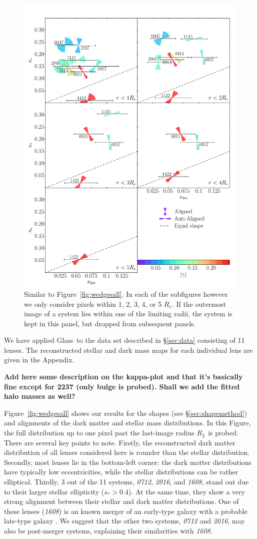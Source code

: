 \documentclass[useAMS,usenatbib]{mn2e}
\def\Glass{{\sc Glass}}
\begin{document}
\begin{figure}
  \centering
  \includegraphics[width=.75\linewidth]{Figures/wedges.pdf}
  \caption[width=\linewidth]{Similar to Figure~\ref{fig:wedgesall}. In each of the subfigures however we only consider pixels within 1, 2, 3, 4, or 5 $R_e$. If the outermost image of a system lies within one of the limiting radii, the system is kept in this panel, but dropped from subsequent panels.}
  \label{fig:wedgesradii}
\end{figure}

We have applied \Glass\ to the data set described in \S\ref{sec:data} consisting of 11 lenses. The reconstructed stellar and dark mass maps for each individual lens are given in the Appendix.

\textbf{Add here some description on the kappa-plot and that it's basically fine except for 2237 (only bulge is probed). Shall we add the fitted halo masses as well?}

Figure~\ref{fig:wedgesall} shows our results for the shapes (see \S\ref{sec:shapemethod}) and alignments of the dark matter and stellar mass distributions. In this Figure, the full distribution up to one pixel past the last-image radius $R_{L}$ is probed. There are several key points to note. Firstly, the reconstructed dark matter distribution of all lenses considered here is rounder than the stellar distribution. Secondly, most lenses lie in the bottom-left corner: the dark matter distributions have typically low eccentricities, while the stellar distributions can be rather elliptical. Thirdly, 3 out of the 11 systems, {\it0712}, {\it2016}, and {\it1608}, stand out due to their larger stellar ellipticity ($s_* > 0.4$). At the same time, they show a very strong alignment between their stellar and dark matter distributions. One of these lenses ({\it1608}) is an known merger of an early-type galaxy with a probable late-type galaxy \citep{2003ApJ...584..100S}. We suggest that the other two systems, {\it0712} and {\it2016}, may also be post-merger systems, explaining their similarities with {\it1608}.
\end{document}
